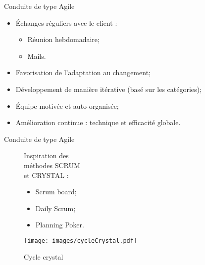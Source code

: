 \begin{frame}{Conduite de type Agile}

\begin{itemize}
 \item Échanges réguliers avec le client :
 \begin{itemize}
  \item Réunion hebdomadaire;
  \item Mails. 
 \end{itemize}
 \item Favorisation de l'adaptation au changement;
 \item Développement de manière itérative (basé sur les catégories);
 \item 	Équipe motivée et auto-organisée;
 \item Amélioration continue : technique et efficacité globale.
\end{itemize}

\end{frame}

\begin{frame}{Conduite de type Agile}

\begin{figure}
  \begin{minipage}[c]{.30\linewidth}
	  Inspiration des \\ méthodes SCRUM \\ et CRYSTAL :

\begin{itemize}
\item Scrum board;
\item Daily Scrum;
\item Planning Poker.
\end{itemize}
  \end{minipage} \hfill
   \begin{minipage}[c]{.60\linewidth}
	  \texttt{[image: images/cycleCrystal.pdf]}
	  \caption{Cycle crystal}
 \end{minipage} 
\end{figure}

\end{frame}

